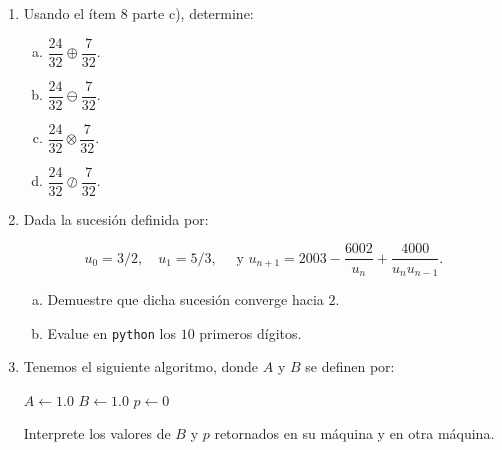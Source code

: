 \documentclass[
	spanish,
	9pt,
	utf8,
	xcolor=table,
	handout,
	aspectratio=1610,
	professionalfonts,
	notheorems,
	mathserif,
]{beamer}
\newcounter{savedenum}
\newcommand*{\saveenum}{\setcounter{savedenum}{\theenumi}}
\newcommand*{\resume}{\setcounter{enumi}{\thesavedenum}}
\begin{document}
\begin{frame}
	\begin{enumerate}
		\resume

		\item
		      Usando el ítem 8 parte c), determine:

		      \begin{multicols}{4}
			      \begin{enumerate}[a)]
				      \item
				            $\dfrac{24}{32}\oplus\dfrac{7}{32}$.

				      \item
				            $\dfrac{24}{32}\ominus\dfrac{7}{32}$.

				      \item
				            $\dfrac{24}{32}\otimes\dfrac{7}{32}$.

				      \item
				            $\dfrac{24}{32}\oslash\dfrac{7}{32}$.
			      \end{enumerate}
		      \end{multicols}

		\item
		      Dada la sucesión definida por:

		      \begin{equation*}
			      u_{0}=3/2,\quad u_{1}=5/3,\quad
			      \text { y }u_{n+1}=2003-\frac{6002}{u_{n}}+\frac{4000}{u_{n} u_{n-1}}.
		      \end{equation*}

		      \begin{multicols}{2}
			      \begin{enumerate}[a)]
				      \item
				            Demuestre que dicha sucesión converge hacia $2$.

				      \item
				            Evalue en \texttt{python} los $10$ primeros dígitos.
			      \end{enumerate}
		      \end{multicols}

		\item
		      Tenemos el siguiente algoritmo, donde $A$ y $B$ se definen por:

		      \begin{algorithm}[H]
			      $A\leftarrow 1.0$\;
			      $B\leftarrow 1.0$\;
			      $p\leftarrow 0$\;
		      \end{algorithm}

		      Interprete los valores de $B$ y $p$ retornados en su máquina y en otra máquina.

		      \saveenum
	\end{enumerate}
\end{frame}
\end{document}
